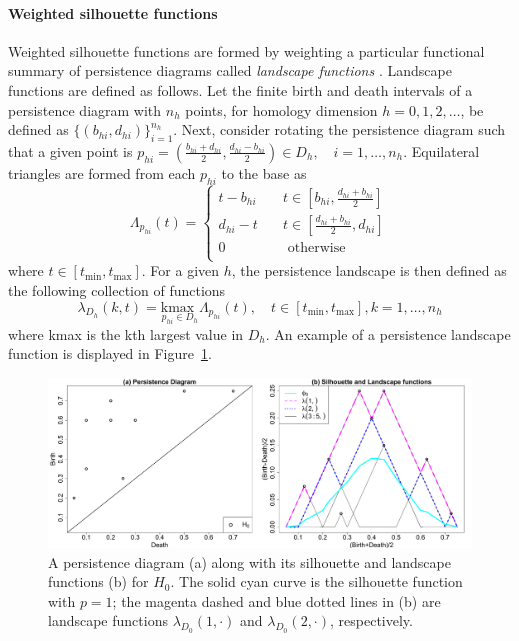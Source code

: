 \documentclass[12pt]{article}
\begin{document}
\paragraph{Weighted silhouette functions}
Weighted silhouette functions are formed by weighting a particular functional summary of persistence diagrams called \emph{landscape functions} \citep{bubenik2015statistical}. 
Landscape functions are defined as follows. Let the finite birth and death intervals of a persistence diagram with $n_h$ points, for homology dimension $h = 0, 1, 2, \ldots$, be defined as $\{(b_{hi},d_{hi})\}_{i = 1}^{n_h}$.  Next, consider rotating the persistence diagram such that a given point is $p_{hi} = \left(\frac{b_{hi}+d_{hi}}{2}, \frac{d_{hi}-b_{hi}}{2}\right) \in D_h, \quad i = 1, \ldots, n_h$.  Equilateral triangles are formed from each $p_{hi}$ to the base as
\begin{equation*}
\Lambda_{p_{hi}}(t) =
  \begin{cases}
    t - b_{hi}  & \quad t \in [b_{hi}, \frac{d_{hi}+b_{hi}}{2}]\\
    d_{hi} - t  & \quad t \in [\frac{d_{hi}+b_{hi}}{2}, d_{hi}]\\
    0  & \quad \text{ otherwise}\\
  \end{cases}
\end{equation*}
where $t \in [t_{\min}, t_{\max}]$. For a given $h$, the persistence landscape is then defined as the following collection of functions
%
\begin{equation*}
\lambda_{D_h}(k, t) = \underset{p_{hi}\in D_h}{\text{kmax }} \Lambda_{p_{hi}}(t), \quad t \in [t_{\min}, t_{\max}], k = 1, \ldots, n_h
\end{equation*}
where kmax is the kth largest value in $D_h$.  An example of a persistence landscape function is displayed in Figure~\ref{fig:landscape}.

\begin{center}
\begin{figure}[htp!]
  \centering
  \includegraphics[width=0.95\linewidth]{fig_landscape_jjc.pdf}
    \caption{A persistence diagram (a) along with its silhouette and landscape functions (b) for $H_0$.  The solid cyan curve is the silhouette function with $p = 1$; the magenta dashed and blue dotted lines in (b) are landscape functions $\lambda_{D_0}(1, \cdot)$ and $\lambda_{D_0}(2, \cdot)$, respectively.}
    \label{fig:landscape}
\end{figure}
\end{center}
\end{document}
